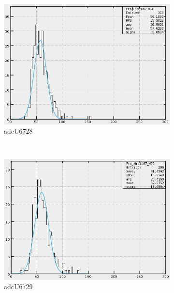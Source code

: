 \begin{figure}[h]
\begin{subfigure}[h]{0.3\textwidth}
        \includegraphics[width=\textwidth, keepaspectratio = true]{adcU67_28}
        \caption{adcU6728}
        \label{fig:adcU67_28}
    \end{subfigure}
    \\
    \begin{subfigure}[h]{0.3\textwidth}
        \centering
        \includegraphics[width=\textwidth, keepaspectratio = true]{adcU67_29}
        \caption{adcU6729}
        \label{fig:adcU67_29}
    \end{subfigure}
    ~
    \begin{subfigure}[h]{0.3\textwidth}
        \centering

\end{subfigure}
\end{figure}
